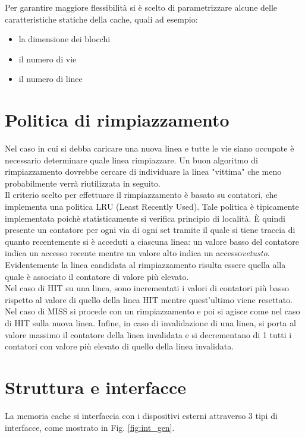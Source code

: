 Per garantire maggiore flessibilit\`a si \`e scelto di parametrizzare alcune delle caratteristiche statiche della cache, quali ad esempio:
\begin{itemize}
\item la dimensione dei blocchi
\item il numero di vie
\item il numero di linee
\end{itemize}


\section{Politica di rimpiazzamento}

Nel caso in cui si debba caricare una nuova linea e tutte le vie siano occupate \`e necessario determinare quale linea rimpiazzare.
Un buon algoritmo di rimpiazzamento dovrebbe cercare di individuare la linea "vittima" che meno probabilmente verr\`a riutilizzata in seguito.\\
Il criterio scelto per effettuare il rimpiazzamento \`e basato su contatori, che implementa una politica LRU (Least Recently Used).
Tale politica \`e tipicamente implementata poich\`e statisticamente si verifica principio di localit\`a.
\`E quindi presente un contatore per ogni via di ogni set tramite il quale si tiene traccia di quanto recentemente si \`e acceduti a ciascuna linea: un valore basso del contatore indica un accesso recente mentre un valore alto indica un accesso\emph{vetusto}.
Evidentemente la linea candidata al rimpiazzamento risulta essere quella alla quale \`e associato il contatore di valore pi\`u elevato.\\
Nel caso di HIT su una linea, sono incrementati i valori di contatori pi\`u basso rispetto al valore di quello della linea HIT mentre quest'ultimo viene resettato.
Nel caso di MISS si procede con un rimpiazzamento e poi si agisce come nel caso di HIT sulla nuova linea.
Infine, in caso di invalidazione di una linea, si porta al valore massimo il contatore della linea invalidata e si decrementano di 1 tutti i contatori con valore pi\`u elevato di quello della linea invalidata.


\section{Struttura e interfacce}
La memoria cache si interfaccia con i dispositivi esterni attraverso 3 tipi di interfacce, come mostrato in Fig. \ref{fig:int_gen}.

